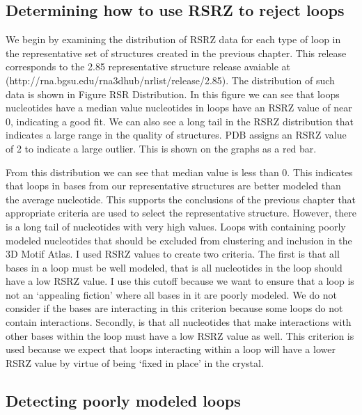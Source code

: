\subsection{Determining how to use RSRZ to reject loops}

We begin by examining the distribution of RSRZ data for each type of loop in the
representative set of structures created in the previous chapter. This release
corresponds to the 2.85 representative structure release avaiable at
(http://rna.bgsu.edu/rna3dhub/nrlist/release/2.85). The distribution of such
data is shown in Figure RSR Distribution. In this figure we can see that loops
nucleotides have a median value nucleotides in loops have an RSRZ value of near
0, indicating a good fit. We can also see a long tail in the RSRZ distribution
that indicates a large range in the quality of structures. PDB assigns an RSRZ
value of 2 to indicate a large outlier. This is shown on the graphs as a red
bar.

\begin{figure}
\end{figure}

From this distribution we can see that median value is less than 0. This
indicates that loops in bases from our representative structures are better
modeled than the average nucleotide. This supports the conclusions of the
previous chapter that appropriate criteria are used to select the representative
structure. However, there is a long tail of nucleotides with very high values.
Loops with containing poorly modeled nucleotides that should be excluded from
clustering and inclusion in the 3D Motif Atlas. I used RSRZ values to create two
criteria. The first is that all bases in a loop must be well modeled, that is
all nucleotides in the loop should have a low RSRZ value. I use this cutoff
because we want to ensure that a loop is not an ‘appealing fiction’ where all
bases in it are poorly modeled. We do not consider if the bases are interacting
in this criterion because some loops do not contain interactions. Secondly, is
that all nucleotides that make interactions with other bases within the loop
must have a low RSRZ value as well. This criterion is used because we expect
that loops interacting within a loop will have a lower RSRZ value by virtue of
being ‘fixed in place’ in the crystal.

\subsection{Detecting poorly modeled loops}

